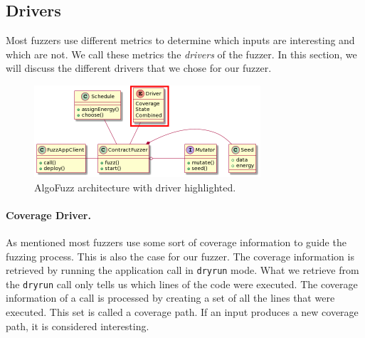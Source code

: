 \subsection*{Drivers}\label{section:drivers}
Most fuzzers use different metrics to determine which inputs are interesting and which are not.
We call these metrics the \textit{drivers} of the fuzzer.
In this section, we will discuss the different drivers that we chose for our fuzzer.


\begin{figure}[htbp]
    \centering
    \includegraphics[width=0.75\textwidth]{figures/arc-driver.png}
    \caption{AlgoFuzz architecture with driver highlighted.}\label{fig:architecture-driver}
\end{figure}

\paragraph{Coverage Driver.}
As mentioned most fuzzers use some sort of coverage information to guide the fuzzing process.
This is also the case for our fuzzer.
The coverage information is retrieved by running the application call in \texttt{dryrun} mode.
What we retrieve from the \texttt{dryrun} call only tells us which lines of the code were executed.
The coverage information of a call is processed by creating a set of all the lines that were executed.
This set is called a coverage path.
If an input produces a new coverage path, it is considered interesting.

